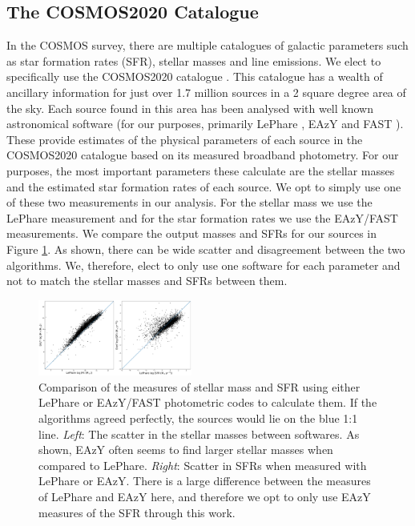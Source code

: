 \subsection{The COSMOS2020 Catalogue}
In the COSMOS survey, there are multiple catalogues of galactic parameters such as star formation rates (SFR), stellar masses and line emissions. We elect to specifically use the COSMOS2020 catalogue \citep{2022ApJS..258...11W}. This catalogue has a wealth of ancillary information for just over 1.7 million sources in a 2 square degree area of the sky. Each source found in this area has been analysed with well known astronomical software (for our purposes, primarily  LePhare \citep{1999MNRAS.310..540A, 2006A&A...457..841I}, EAzY \citep{2008ApJ...686.1503B} and FAST \citep{2017MNRAS.465.3390A}). These provide estimates of the physical parameters of each source in the COSMOS2020 catalogue based on its measured broadband photometry. For our purposes, the most important parameters these calculate are the stellar masses and the estimated star formation rates of each source. We opt to simply use one of these two measurements in our analysis. For the stellar mass we use the LePhare measurement and for the star formation rates we use the EAzY/FAST measurements. We compare the output masses and SFRs for our sources in Figure \ref{fig:difference-measures}. As shown, there can be wide scatter and disagreement between the two algorithms. We, therefore, elect to only use one software for each parameter and not to match the stellar masses and SFRs between them.

\begin{figure}
    \centering
    \includegraphics[width=0.45\textwidth]{Chapter3/figures/mass-sfr-scatter.pdf}
    \caption{Comparison of the measures of stellar mass and SFR using either LePhare or EAzY/FAST photometric codes to calculate them. If the algorithms agreed perfectly, the sources would lie on the blue 1:1 line. \textit{Left}: The scatter in the stellar masses between softwares. As shown, EAzY often seems to find larger stellar masses when compared to LePhare. \textit{Right}: Scatter in SFRs when measured with LePhare or EAzY. There is a large difference between the measures of LePhare and EAzY here, and therefore we opt to only use EAzY measures of the SFR through this work.}
    \label{fig:difference-measures}
\end{figure}

